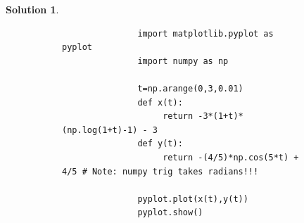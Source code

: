 \documentclass[10pt]{article}
\theoremstyle{definition}
\newtheorem{soln}{Solution}
\begin{document}
\begin{soln}
\begin{figure}[h]
\begin{subfigure}[t]{0.49\textwidth}
          \end{subfigure}\hfill
          \begin{subfigure}[t]{0.49\textwidth}
               \begin{verbatim}
               import matplotlib.pyplot as pyplot
               import numpy as np
     
               t=np.arange(0,3,0.01)
               def x(t):
                    return -3*(1+t)*(np.log(1+t)-1) - 3
               def y(t):
                    return -(4/5)*np.cos(5*t) + 4/5 # Note: numpy trig takes radians!!!
     
               pyplot.plot(x(t),y(t))
               pyplot.show()
         \end{verbatim}
          \end{subfigure}%
     \end{figure}
\end{soln}
\end{document}

